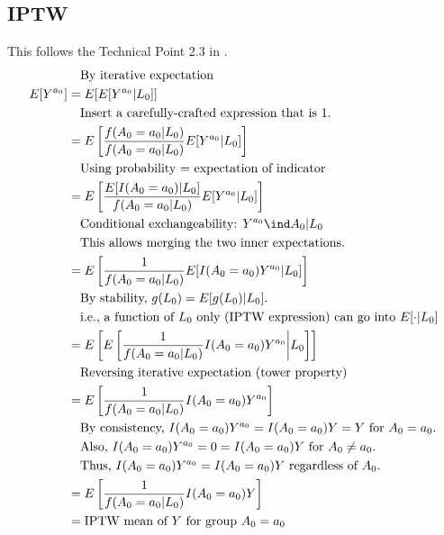 \documentclass[dvipdfmx,10pt]{article}
\begin{document}
\subsection{IPTW}
\label{sec:orga145200}
This follows the Technical Point 2.3 in \cite{hernanCausalInference2019}.
\begin{align*}
  &~~~\text{By iterative expectation}\\
  E[Y^{a_{0}}]
  &= E[E[Y^{a_{0}} | L_{0}]]\\
  &~~~\text{Insert a carefully-crafted expression that is 1.}\\
  &= E \left[ \frac{f(A_{0}=a_{0} | L_{0})}{f(A_{0}=a_{0} | L_{0})} E[Y^{a_{0}} | L_{0}] \right]\\
  &~~~\text{Using probability = expectation of indicator}\\
  &= E \left[ \frac{E[I(A_{0}=a_{0}) | L_{0}]}{f(A_{0}=a_{0} | L_{0})} E[Y^{a_{0}} | L_{0}] \right]\\
  &~~~\text{Conditional exchangeability: } Y^{a_{0}} \ind A_{0} | L_{0}\\
  &~~~\text{This allows merging the two inner expectations.}\\
  &= E \left[ \frac{1}{f(A_{0}=a_{0} | L_{0})} E[I(A_{0}=a_{0})Y^{a_{0}} | L_{0}] \right]\\
  &~~~\text{By stability, } g(L_{0}) = E[g(L_{0}) | L_{0}].\\
  &~~~\text{i.e., a function of $L_{0}$ only (IPTW expression) can go into $E[\cdot | L_{0}]$}\\
  &= E \left[ E \left[ \frac{1}{f(A_{0}=a_{0} | L_{0})} I(A_{0}=a_{0})Y^{a_{0}} \bigg| L_{0} \right] \right]\\
  &~~~\text{Reversing iterative expectation (tower property)}\\
  &= E \left[ \frac{1}{f(A_{0}=a_{0} | L_{0})} I(A_{0}=a_{0})Y^{a_{0}} \right]\\
  &~~~\text{By consistency, }I(A_{0}=a_{0})Y^{a_{0}} = I(A_{0}=a_{0})Y = Y \text{ for } A_{0} = a_{0}.\\
  &~~~\text{Also, }I(A_{0}=a_{0})Y^{a_{0}} = 0 = I(A_{0}=a_{0})Y \text{ for } A_{0} \ne a_{0}.\\
  &~~~\text{Thus, }I(A_{0}=a_{0})Y^{a_{0}} = I(A_{0}=a_{0})Y \text{ regardless of } A_{0}.\\
  &= E \left[ \frac{1}{f(A_{0}=a_{0} | L_{0})} I(A_{0}=a_{0})Y \right]\\
  &= \text{IPTW mean of $Y$ for group $A_{0} = a_{0}$}\\
\end{align*}
\end{document}
